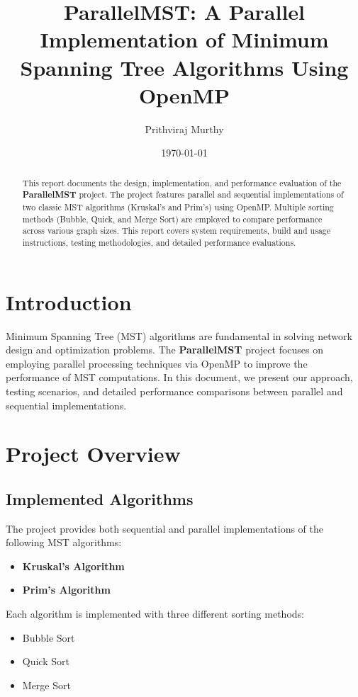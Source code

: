 \documentclass[11pt]{article}
\title{ParallelMST: A Parallel Implementation of Minimum Spanning Tree Algorithms Using OpenMP}
\author{Prithviraj Murthy}
\date{\today}
\begin{document}
\maketitle
\tableofcontents
\newpage

\begin{abstract}
This report documents the design, implementation, and performance evaluation of the \textbf{ParallelMST} project. The project features parallel and sequential implementations of two classic MST algorithms (Kruskal's and Prim's) using OpenMP. Multiple sorting methods (Bubble, Quick, and Merge Sort) are employed to compare performance across various graph sizes. This report covers system requirements, build and usage instructions, testing methodologies, and detailed performance evaluations.
\end{abstract}

\section{Introduction}
Minimum Spanning Tree (MST) algorithms are fundamental in solving network design and optimization problems. The \textbf{ParallelMST} project focuses on employing parallel processing techniques via OpenMP to improve the performance of MST computations. In this document, we present our approach, testing scenarios, and detailed performance comparisons between parallel and sequential implementations.

\section{Project Overview}
\subsection{Implemented Algorithms}
The project provides both sequential and parallel implementations of the following MST algorithms:
\begin{itemize}
    \item \textbf{Kruskal's Algorithm}
    \item \textbf{Prim's Algorithm}
\end{itemize}
Each algorithm is implemented with three different sorting methods:
\begin{itemize}
    \item Bubble Sort
    \item Quick Sort
    \item Merge Sort
\end{itemize}
\end{document}

